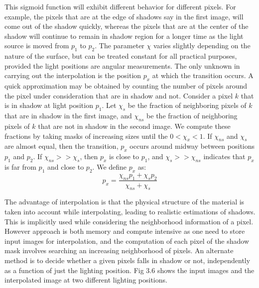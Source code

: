 This sigmoid function will exhibit different behavior for different pixels. For
example, the pixels that are at the edge of shadows say in the first image, will
come out of the shadow quickly, whereas the pixels that are at the center of the
shadow will continue to remain in shadow region for a longer time as the light
source is moved from $p_1$ to $p_2$. The parameter $\chi$ varies slightly depending
on the nature of the surface, but can be treated constant for all practical
purposes, provided the light positions are angular measurements. The only
unknown in carrying out the interpolation is the position $p_x$ at which the
transition occurs. 
A quick approximation
may be obtained by counting the number of pixels around the pixel under
consideration that are in shadow and not.
Consider a pixel $k$ that is in shadow at light position $p_1$. Let $\chi_s$ be the
fraction of neighboring pixels of $k$ that are in shadow in the first image, and
$\chi_{ns}$ be the fraction of neighboring pixels of $k$ that are not in shadow in
the second image. We compute these fractions by taking masks of increasing sizes
until the $0 < \chi_x < 1$. If $\chi_{ns}$ and $\chi_{s}$ are almost equal, then the
transition, $p_x$ occurs around midway between positions $p_1$ and $p_2$. If
$\chi_{ns} >> \chi_{s}$, then $p_x$ is close to $p_1$, and $\chi_{s} >> \chi_{ns}$ indicates
that $p_x$ is far from $p_1$ and close to $p_2$. We define $p_x$ as: 
\begin{equation}
p_x = \frac{\chi_{ns} p_1 + \chi_s p_2}{\chi_{ns} + \chi_s}
\end{equation}

The advantage of interpolation is that the physical structure of the material is
taken into account while interpolating, leading to realistic estimations of
shadows. This is implicitly used while considering the neighborhood information
of a pixel. However approach is both memory and compute intensive as one need to
store input images for interpolation, and the computation of each
pixel of the shadow mask involves searching an increasing neighborhood of
pixels. An alternate method is to decide whether a given pixels falls in shadow
or not, independently as a function of just the lighting position. Fig 3.6 shows 
the input images and the interpolated image at two different lighting positions.


